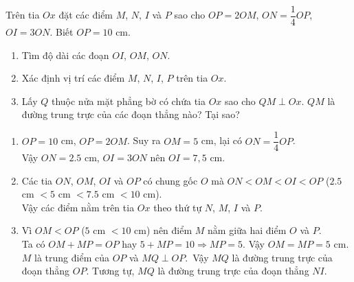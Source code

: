 \begin{vd}%
Trên tia $Ox$ đặt các điểm $M$, $N$, $I$ và $P$ sao cho $OP=2OM$, $ON=\dfrac{1}{4}OP$, $OI=3ON$. Biết $OP=10$ cm.
\begin{enumerate}
	\item Tìm độ dài các đoạn $OI$, $OM$, $ON$.
	\item Xác định vị trí các điểm $M$, $N$, $I$, $P$ trên tia $Ox$.
	\item Lấy $Q$ thuộc nửa mặt phẳng bờ có chứa tia $Ox$ sao cho $QM \perp Ox$. $QM$ là đường trung trực của các đoạn thẳng nào? Tại sao?
\end{enumerate}
\loigiai
{   \begin{center}
	\end{center}
	\begin{enumerate}
			\item $OP=10$ cm, $OP=2OM$. Suy ra $OM=5$ cm, lại có $ON=\dfrac{1}{4}OP$.\\
			Vậy $ON=2.5$ cm, $OI=3ON$ nên $OI=7,5$ cm.
			\item Các tia $ON$, $OM$, $OI$ và $OP$ có chung gốc $O$ mà $ON<OM<OI<OP$ ($2.5$ cm $<5$ cm $<7.5$ cm $<10$ cm).\\
			Vậy các điểm nằm trên tia $Ox$ theo thứ tự $N$, $M$, $I$ và $P$.
			\item Vì $OM<OP$ ($5$ cm $<10$ cm) nên điểm $M$ nằm giữa hai điểm $O$ và $P$.\\
			Ta có $OM+MP=OP$ hay $5+MP=10 \Rightarrow MP=5$. Vậy $OM=MP=5$ cm.\\
			$M$ là trung điểm của $OP$ và $MQ \perp OP$.\
			Vậy $MQ$ là đường trung trực của đoạn thẳng $OP$. Tương tự, $MQ$ là đường trung trực của đoạn thẳng $NI$.
	\end{enumerate}
}
\end{vd}

